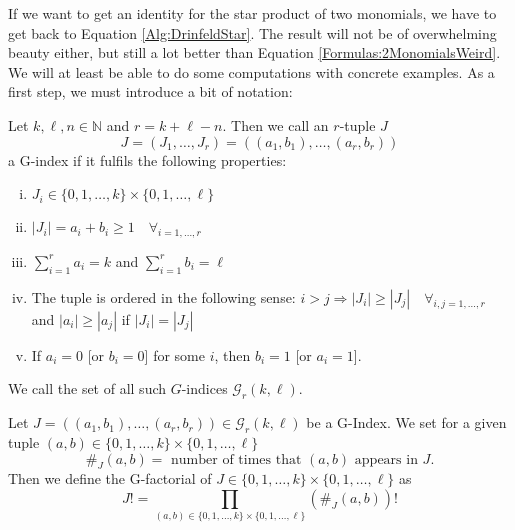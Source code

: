 If we want to get an identity for the star product of two monomials, we have 
to get back to Equation \eqref{Alg:DrinfeldStar}. The result will not be of 
overwhelming beauty either, but still a lot better than Equation 
\eqref{Formulas:2MonomialsWeird}. We will at least be able to do some 
computations with concrete examples. As a first step, we must introduce 
a bit of notation:
\begin{definition}[G-Index]
	\label{Def:GuttIndex}
	Let $k, \ell, n \in \mathbb{N}$ and $r = k + \ell - n$. 
	Then we call an $r$-tuple $J$
	\begin{equation*}
		J = (J_1, \ldots, J_r) 
		= 
		((a_1, b_1), \ldots, (a_r, b_r)) 
	\end{equation*}
  	a G-index if it fulfils the following properties:
	\begin{enumerate}[(i)]
		\item
		$J_i \in \{0, 1, \ldots, k\} \times \{0, 1, \ldots, \ell\}$
		
  		\item 
		$|J_i| 
		= 
		a_i + b_i \geq 1 
		\quad \forall_{i = 1, \ldots, r}$
		
		\item 
		$\sum\limits_{i=1}^{r} a_i = k$ 
		and 
		$\sum\limits_{i=1}^{r} b_i = \ell$
		
		\item
		The tuple is ordered in the following sense:
		$i>j \Rightarrow |J_i| \geq |J_j| \quad \forall_{i,j = 1, 
		\ldots, r}$ and $|a_i| \geq |a_j|$ if $|J_i| = |J_j|$
		
		\item 
		If $a_i = 0$ [or $b_i = 0$] for some $i$, 
		then $b_i = 1$ [or $a_i = 1$].
	\end{enumerate}
	We call the set of all such $G$-indices	$\mathcal{G}_r(k,\ell)$.
\end{definition}
\begin{definition}[G-Factorial]
	\label{Def:GuttFactorial}
	Let $J = ((a_1, b_1), \ldots, (a_r, b_r)) \in \mathcal{G}_r(k,
	\ell)$ be a G-Index. We set for a given tuple $(a,b) \in \{0, 1, 
	\ldots, k\} \times \{0, 1, \ldots, \ell\}$
	\begin{equation*}
		\#_J (a,b)
		= 
		\textrm{ number of times that $(a,b)$ appears in } J.
	\end{equation*}
	Then we define the G-factorial of $J \in \{0, 1, \ldots, k\} \times 
	\{0, 1, \ldots, \ell\}$ as
	\begin{equation*}
		J!
		= 
		\prod\limits_{
			(a,b) \in 
			\{0, 1, \ldots, k\} 
			\times 
			\{0, 1, \ldots, \ell\}
		}
		\left( \#_J (a,b) \right)!
	\end{equation*}
\end{definition}
